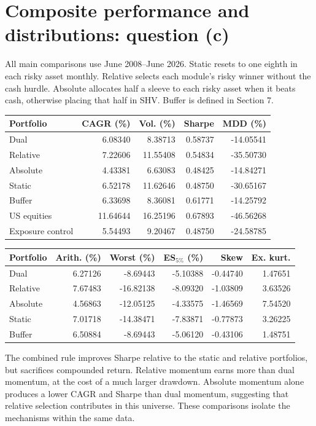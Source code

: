 \documentclass[11pt,letterpaper]{article}
\begin{document}
\section{Composite performance and distributions: question (c)}
All main comparisons use June 2008--June 2026. Static resets to one eighth in each risky asset monthly. Relative selects each module's risky winner without the cash hurdle. Absolute allocates half a sleeve to each risky asset when it beats cash, otherwise placing that half in SHV. Buffer is defined in Section 7.
\begin{center}\small\begin{tabular}{lrrrr}\toprule
Portfolio & CAGR (\%) & Vol. (\%) & Sharpe & MDD (\%)\\\midrule
Dual & 6.08340 & 8.38713 & 0.58737 & -14.05541\\
Relative & 7.22606 & 11.55408 & 0.54834 & -35.50730\\
Absolute & 4.43381 & 6.63083 & 0.48425 & -14.84271\\
Static & 6.52178 & 11.62646 & 0.48750 & -30.65167\\
Buffer & 6.33698 & 8.36081 & 0.61771 & -14.25792\\
US equities & 11.64644 & 16.25196 & 0.67893 & -46.56268\\
Exposure control & 5.54493 & 9.20467 & 0.48750 & -24.58785\\
\bottomrule\end{tabular}\end{center}
\begin{center}\small\begin{tabular}{lrrrrr}\toprule
Portfolio & Arith. (\%) & Worst (\%) & ES$_{5\%}$ (\%) & Skew & Ex. kurt.\\\midrule
Dual & 6.27126 & -8.69443 & -5.10388 & -0.44740 & 1.47651\\
Relative & 7.67483 & -16.82138 & -8.09320 & -1.03809 & 3.63526\\
Absolute & 4.56863 & -12.05125 & -4.33575 & -1.46569 & 7.54520\\
Static & 7.01718 & -14.38471 & -7.83871 & -0.77873 & 3.26225\\
Buffer & 6.50884 & -8.69443 & -5.06120 & -0.43106 & 1.48751\\
\bottomrule\end{tabular}\end{center}
The combined rule improves Sharpe relative to the static and relative portfolios, but sacrifices compounded return. Relative momentum earns more than dual momentum, at the cost of a much larger drawdown. Absolute momentum alone produces a lower CAGR and Sharpe than dual momentum, suggesting that relative selection contributes in this universe. These comparisons isolate the mechanisms within the same data.
\end{document}
